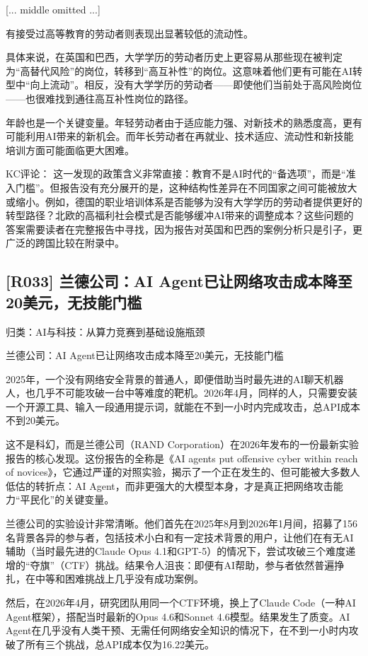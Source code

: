 \documentclass[11pt]{ctexart}
\begin{document}
[... middle omitted ...]

有接受过高等教育的劳动者则表现出显著较低的流动性。

具体来说，在英国和巴西，大学学历的劳动者历史上更容易从那些现在被判定为“高替代风险”的岗位，转移到“高互补性”的岗位。这意味着他们更有可能在AI转型中“向上流动”。相反，没有大学学历的劳动者——即使他们当前处于高风险岗位——也很难找到通往高互补性岗位的路径。

年龄也是一个关键变量。年轻劳动者由于适应能力强、对新技术的熟悉度高，更有可能利用AI带来的新机会。而年长劳动者在再就业、技术适应、流动性和新技能培训方面可能面临更大困难。

KC评论： 这一发现的政策含义非常直接：教育不是AI时代的“备选项”，而是“准入门槛”。但报告没有充分展开的是，这种结构性差异在不同国家之间可能被放大或缩小。例如，德国的职业培训体系是否能够为没有大学学历的劳动者提供更好的转型路径？北欧的高福利社会模式是否能够缓冲AI带来的调整成本？这些问题的答案需要读者在完整报告中寻找，因为报告对英国和巴西的案例分析只是引子，更广泛的跨国比较在附录中。

\subsection{[R033] 兰德公司：AI Agent已让网络攻击成本降至20美元，无技能门槛}
{\small\color{refgray}归类：AI与科技：从算力竞赛到基础设施瓶颈}

兰德公司：AI Agent已让网络攻击成本降至20美元，无技能门槛

2025年，一个没有网络安全背景的普通人，即便借助当时最先进的AI聊天机器人，也几乎不可能攻破一台中等难度的靶机。2026年4月，同样的人，只需要安装一个开源工具、输入一段通用提示词，就能在不到一小时内完成攻击，总API成本不到20美元。

这不是科幻，而是兰德公司（RAND Corporation）在2026年发布的一份最新实验报告的核心发现。这份报告的全称是《AI agents put offensive cyber within reach of novices》，它通过严谨的对照实验，揭示了一个正在发生的、但可能被大多数人低估的转折点：AI Agent，而非更强大的大模型本身，才是真正把网络攻击能力“平民化”的关键变量。

兰德公司的实验设计非常清晰。他们首先在2025年8月到2026年1月间，招募了156名背景各异的参与者，包括技术小白和有一定技术背景的用户，让他们在有无AI辅助（当时最先进的Claude Opus 4.1和GPT-5）的情况下，尝试攻破三个难度递增的“夺旗”（CTF）挑战。结果令人沮丧：即便有AI帮助，参与者依然普遍挣扎，在中等和困难挑战上几乎没有成功案例。

然后，在2026年4月，研究团队用同一个CTF环境，换上了Claude Code（一种AI Agent框架），搭配当时最新的Opus 4.6和Sonnet 4.6模型。结果发生了质变。AI Agent在几乎没有人类干预、无需任何网络安全知识的情况下，在不到一小时内攻破了所有三个挑战，总API成本仅为16.22美元。
\end{document}
